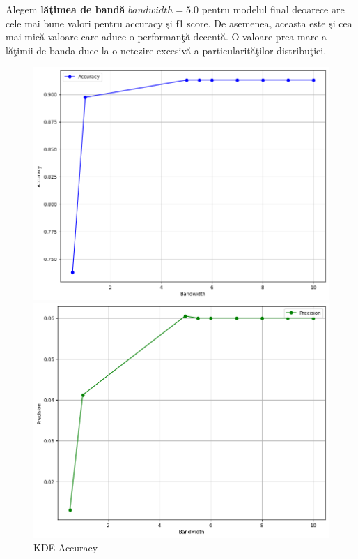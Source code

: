 Alegem \textbf{lăţimea de bandă} $bandwidth=5.0$ pentru modelul final deoarece are cele mai bune 
valori pentru accuracy şi f1 score. De asemenea, aceasta este şi cea mai mică valoare 
care aduce o performanţă decentă. O valoare prea mare a lăţimii de banda duce 
la o netezire excesivă a particularităţilor distribuţiei.

\begin{figure}[p] %
    \begin{minipage}[t]{0.5\textwidth}
        \vspace{0pt}
        \includegraphics[width=\textwidth]{images/kde-accuracy.png}
        \caption{KDE Accuracy}
    \end{minipage}
    \hfill
    \begin{minipage}[t]{0.5\textwidth}
        \vspace{0pt}
        \includegraphics[width=\textwidth]{images/kde-precision.png}

\end{minipage}
\end{figure}
